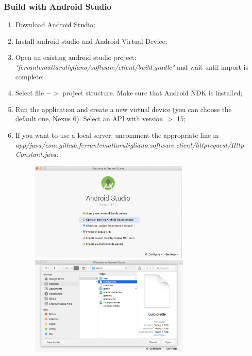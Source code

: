 \documentclass[a4paper]{article}
\begin{document}
\subsubsection{Build with Android Studio}
\begin{enumerate}
    \item Download \href{https://developer.android.com/studio/}{\underline{Android Studio}};
    \item Install android studio and Android Virtual Device;
    \item Open an existing android studio project:
    \newline\textit{"ferrantemattarutigliano/software/client/build.gradle"} and wait until import is complete;
    \item Select file ${->}$ project structure. Make sure that Android NDK is installed;
    \item Run the application and create a new virtual device (you can choose the default one, Nexus 6). Select an API with version ${>}$ 15;
    \item If you want to use a local server, uncomment the appropriate line in \textit{app/java/com.github.ferrantemattarutigliano.software.client/httprequest/HttpConstant.java}.
    \begin{figure}[!htpb]
    \centering
    \includegraphics[height=50mm]{ITD/images/android_studio1.png}
    \includegraphics[height=50mm]{ITD/images/android_studio2.png}
    \end{figure}
\end{enumerate}
\end{document}
